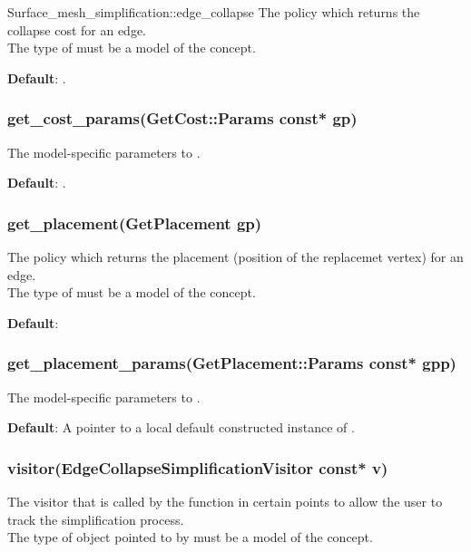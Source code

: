 \begin{ccRefFunction}{Surface_mesh_simplification::edge_collapse}
The policy which returns the collapse cost for an edge.\\
The type of  must be a model of the  concept.

\textbf{Default}: 
.


\subsubsection*{get\_cost\_params(GetCost::Params const* gp)}

The model-specific parameters to .

\textbf{Default}: .


\subsubsection*{get\_placement(GetPlacement gp)}

The policy which returns the placement (position of the replacemet vertex)
for an edge.\\
The type of  must be a model of the  concept.

\textbf{Default}: 



\subsubsection*{get\_placement\_params(GetPlacement::Params const* gpp)}

The model-specific parameters to .

\textbf{Default}: A pointer to a local default constructed instance of .



\subsubsection*{visitor(EdgeCollapseSimplificationVisitor const* v)}

The visitor that is called by the  function
in certain points to allow the user to track the simplification process.\\
The type of object pointed to by  must be a model of the  concept.


\end{ccRefFunction}
